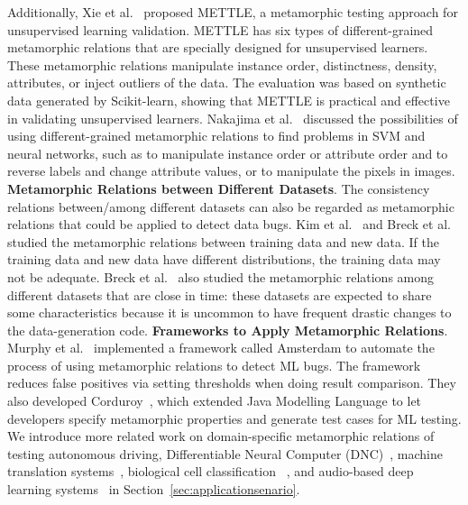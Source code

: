 Additionally, Xie et al.~ proposed METTLE, a metamorphic testing approach for unsupervised learning validation.
METTLE has six types of different-grained metamorphic relations that are specially designed for unsupervised learners.
These metamorphic relations manipulate instance order, distinctness, density, attributes, or inject outliers of the data. The evaluation was based on synthetic data generated by Scikit-learn, showing that METTLE is practical and effective in validating unsupervised learners.
Nakajima et al.~ discussed the possibilities of using different-grained metamorphic relations to find problems in SVM and neural networks, such as to manipulate instance order or attribute order and to reverse labels and change attribute values, or to manipulate the pixels in images.
\noindent \textbf{Metamorphic Relations between Different Datasets}.
The consistency relations between/among different datasets can also be regarded as metamorphic relations that could be applied to detect data bugs. 
Kim et al.~ and Breck et al.~ studied the metamorphic relations between training data and new data. If the training data and new data have different distributions, the training data may not be adequate.
Breck et al.~ also studied the metamorphic relations among different datasets that are close in time: these datasets are expected to share some characteristics because it is uncommon to have frequent drastic changes to the data-generation code.
\noindent \textbf{Frameworks to Apply Metamorphic Relations}.
Murphy et al.~ implemented a framework called Amsterdam to automate the process of using metamorphic relations to detect ML bugs. 
The framework reduces false positives via setting thresholds when doing result comparison.
They also developed Corduroy~, which extended Java Modelling Language to let developers specify metamorphic properties and generate test cases for ML testing.
We introduce more related work on domain-specific metamorphic relations of testing autonomous driving, Differentiable Neural Computer (DNC)~, machine translation systems~, biological cell classification ~, and audio-based deep learning systems~ in Section~\ref{sec:applicationsenario}.

